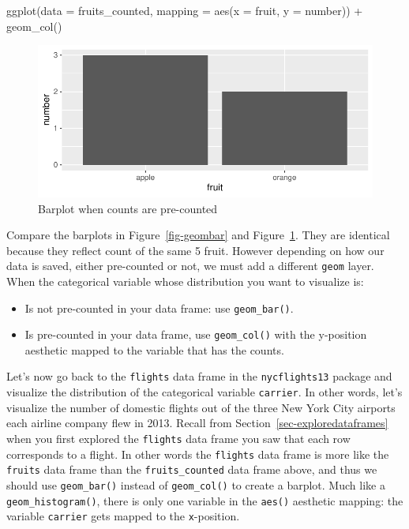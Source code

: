 \documentclass[
  letterpaper,
  DIV=11,
  numbers=noendperiod]{scrreprt}
\newenvironment{Shaded}{\begin{snugshade}}{\end{snugshade}}
\newcommand{\AttributeTok}[1]{\textcolor[rgb]{0.40,0.45,0.13}{#1}}
\newcommand{\FunctionTok}[1]{\textcolor[rgb]{0.28,0.35,0.67}{#1}}
\newcommand{\NormalTok}[1]{\textcolor[rgb]{0.00,0.23,0.31}{#1}}
\newcommand{\SpecialCharTok}[1]{\textcolor[rgb]{0.37,0.37,0.37}{#1}}
\providecommand{\tightlist}{%
  \setlength{\itemsep}{0pt}\setlength{\parskip}{0pt}}\usepackage{longtable,booktabs,array}
\theoremstyle{definition}
\theoremstyle{remark}
\begin{document}
\begin{Shaded}
\begin{Highlighting}[]
\FunctionTok{ggplot}\NormalTok{(}\AttributeTok{data =}\NormalTok{ fruits\_counted, }\AttributeTok{mapping =} \FunctionTok{aes}\NormalTok{(}\AttributeTok{x =}\NormalTok{ fruit, }\AttributeTok{y =}\NormalTok{ number)) }\SpecialCharTok{+}
  \FunctionTok{geom\_col}\NormalTok{()}
\end{Highlighting}
\end{Shaded}

\begin{figure}[H]

{\centering \includegraphics{02-visualization_files/figure-pdf/fig-geomcol-1.pdf}

}

\caption{\label{fig-geomcol}Barplot when counts are pre-counted}

\end{figure}

Compare the barplots in Figure~\ref{fig-geombar} and
Figure~\ref{fig-geomcol}. They are identical because they reflect count
of the same 5 fruit. However depending on how our data is saved, either
pre-counted or not, we must add a different \texttt{geom} layer. When
the categorical variable whose distribution you want to visualize is:

\begin{itemize}
\tightlist
\item
  Is not pre-counted in your data frame: use \texttt{geom\_bar()}.
\item
  Is pre-counted in your data frame, use \texttt{geom\_col()} with the
  y-position aesthetic mapped to the variable that has the counts.
\end{itemize}

Let's now go back to the \texttt{flights} data frame in the
\texttt{nycflights13} package and visualize the distribution of the
categorical variable \texttt{carrier}. In other words, let's visualize
the number of domestic flights out of the three New York City airports
each airline company flew in 2013. Recall from
Section~\ref{sec-exploredataframes} when you first explored the
\texttt{flights} data frame you saw that each row corresponds to a
flight. In other words the \texttt{flights} data frame is more like the
\texttt{fruits} data frame than the \texttt{fruits\_counted} data frame
above, and thus we should use \texttt{geom\_bar()} instead of
\texttt{geom\_col()} to create a barplot. Much like a
\texttt{geom\_histogram()}, there is only one variable in the
\texttt{aes()} aesthetic mapping: the variable \texttt{carrier} gets
mapped to the \texttt{x}-position.
\end{document}
